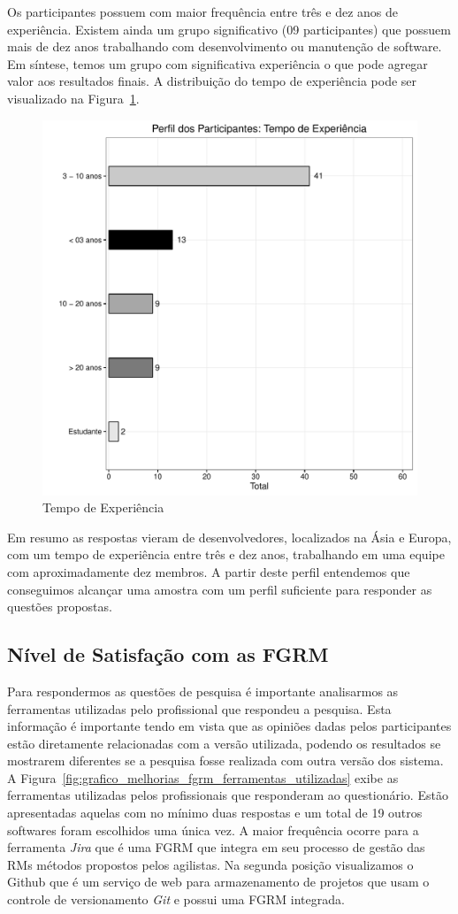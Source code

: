 Os participantes possuem com maior frequência entre três e dez anos de
experiência. Existem ainda um grupo significativo (09 participantes) que possuem
mais de dez anos trabalhando com desenvolvimento ou manutenção de software. Em
síntese, temos um grupo com significativa experiência o que pode agregar valor
aos resultados finais. A distribuição do tempo de experiência pode ser
visualizado na Figura~\ref{fig:grafico_melhorias_fgrm_tempo_experiencia}.

\begin{figure}[htpb]
	\centering
	\includegraphics[width=0.6\linewidth]{./chapter-pesquisa-com-profissionais/img/grafico_melhorias_fgrm_tempo_experiencia.pdf}
	\caption{Tempo de Experiência}
\label{fig:grafico_melhorias_fgrm_tempo_experiencia}
\end{figure}

Em resumo as respostas vieram de desenvolvedores, localizados na Ásia e Europa,
com um tempo de experiência entre três e dez anos, trabalhando em uma equipe com
aproximadamente dez membros. A partir deste perfil entendemos que conseguimos
alcançar uma amostra com um perfil suficiente para responder as questões
propostas.

\subsection{Nível de Satisfação com as FGRM}
\label{sub:nivel_de_satisfação_com_as_fgrm}

Para respondermos as questões de pesquisa é importante analisarmos as
ferramentas utilizadas pelo profissional que respondeu a pesquisa. Esta
informação é importante tendo em vista que as opiniões dadas pelos
participantes estão diretamente relacionadas com a versão utilizada, podendo os
resultados se mostrarem diferentes se a pesquisa fosse realizada com outra
versão dos sistema. A
Figura~\ref{fig:grafico_melhorias_fgrm_ferramentas_utilizadas} exibe as
ferramentas utilizadas pelos profissionais que responderam ao questionário.
Estão apresentadas aquelas com no mínimo duas respostas e um total de 19 outros
softwares foram escolhidos uma única vez. A maior frequência ocorre para a
ferramenta \textit{Jira} que é uma FGRM que integra em seu processo de gestão
das RMs métodos propostos pelos agilistas. Na segunda posição visualizamos o
Github que é um serviço de web para armazenamento de projetos que usam o
controle de versionamento \textit{Git} e possui uma FGRM integrada.

